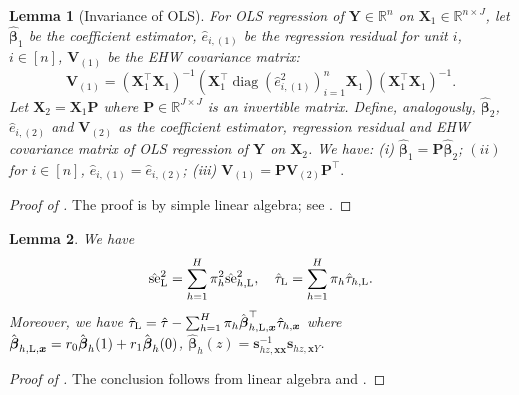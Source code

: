 \documentclass[12pt]{article}
\newtheorem{lemma}{Lemma}
\newcommand{\se}{\textnormal{se}}
\newcommand{\Lin}{\textnormal{L}}
\newcommand{\diag}{\operatorname{diag}}
\newcommand{\bs}{\boldsymbol}
\begin{document}
\begin{lemma}[Invariance of OLS]
\label{lem:invariance-principle}
    For OLS regression of $\bs{Y} \in \mathbb{R}^{n}$ on $\bs{X}_1 \in \mathbb{R}^{n\times J}$, let $\hat{\bs{\beta}}_1$ be the coefficient estimator, $\hat{e}_{i,(1)}$ be the regression residual for unit $i$, $i \in [n]$, $\bs{V}_{(1)}$ be the EHW covariance matrix:
    \[
    \bs{V}_{(1)} = (\bs{X}_1^\top \bs{X}_1)^{-1}(\bs{X}_1^\top \diag(\hat{e}^2_{i,(1)})_{i=1}^n \bs{X}_1)(\bs{X}_1^\top \bs{X}_1)^{-1}.
    \]
    Let $\bs{X}_2 = \bs{X}_1\bs{P}$ where $\bs{P} \in \mathbb{R}^{J\times J}$ is an invertible matrix. Define, analogously,  $\hat{\bs{\beta}}_2$, $\hat{e}_{i,(2)}$ and $\bs{V}_{(2)}$ as the coefficient estimator, regression residual and EHW covariance matrix of OLS regression of $\bs{Y}$ on $\bs{X}_2$. We have: (i) $  \hat{\bs{\beta}}_1 =  \bs{P}\hat{\bs{\beta}}_2$; $(ii)$ for $i\in [n]$, $\hat{e}_{i,(1)} = \hat{e}_{i,(2)}$; (iii) $ \bs{V}_{(1)}  =  \bs{P}\bs{V}_{(2)} \bs{P}^\top .$
\end{lemma}
\begin{proof}[Proof of ]
The proof is by simple linear algebra; see \cite{ding2024linear}.
\end{proof}


\begin{lemma}
\label{lem:lin-estimator-expression}
 We have
    \[
     \hat{\se}^2_{\Lin} = \sum_{h=1}^H\pi_{h}^2\hat{\se}^2_{h,\Lin}, \quad   \hat{\tau}_{\Lin} = \sum_{h=1}^H \pi_h \hat{\tau}_{h,\Lin}.
    \]
    Moreover, we have $\hat{\tau}_{\Lin} = \hat{\tau} - \sum_{h=1}^H \pi_{h} \hat{\bs{\beta}}_{h,\Lin,\bs{x}}^\top\hat{\tau}_{h,\bs{x}}$ where $\hat{\bs{\beta}}_{h,\Lin,\bs{x}} =r_0\hat{\bs{\beta}}_{h}(1)+r_1\hat{\bs{\beta}}_{h}(0)$, $\hat{\bs{\beta}}_h(z) = \bs{s}_{hz,\bs{x}\bs{x}}^{-1} \bs{s}_{hz,\bs{x}{Y}}$.
\end{lemma}
\begin{proof}[Proof of ]
The conclusion follows from linear algebra and .
\end{proof}
\end{document}
